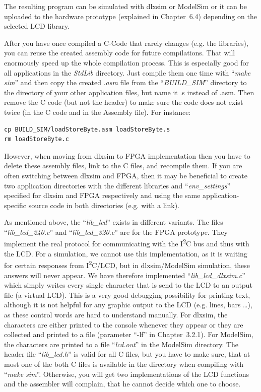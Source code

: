 The resulting program can be simulated with dlxsim or ModelSim or it can
be uploaded to the hardware prototype (explained in Chapter~6.4)
depending on the selected LCD library.

After you have once compiled a C-Code that rarely changes (e.g. the
libraries), you can reuse the created assembly code for future
compilations. That will enormously speed up the whole compilation
process. This is especially good for all applications in the
\emph{StdLib} directory. Just compile them one time with ``\emph{make
sim}'' and then copy the created .\emph{asm} file from the
``\emph{BUILD\_SIM}'' directory to the directory of your other
application files, but name it .s instead of .asm. Then remove the C
code (but not the header) to make sure the code does not exist twice (in
the C code and in the Assembly file). For instance:
\begin{lstlisting}
cp BUILD_SIM/loadStoreByte.asm loadStoreByte.s
rm loadStoreByte.c	
\end{lstlisting}
However, when moving from dlxsim to FPGA implementation then you have to
delete these assembly files, link to the C files, and recompile them. If
you are often switching between dlxsim and FPGA, then it may be
beneficial to create two application directories with the different
libraries and ``\emph{env\_settings}'' specified for dlxsim and FPGA
respectively and using the same application-specific source code in both
directories (e.g. with a link).

As mentioned above, the ``\emph{lib\_lcd}'' exists in different
variants. The files ``\emph{lib\_lcd\_240.c}'' and
``\emph{lib\_lcd\_320.c}'' are for the FPGA prototype. They implement
the real protocol for communicating with the I\textsuperscript{2}C bus
and thus with the LCD. For a simulation, we cannot use this
implementation, as it is waiting for certain responses from
I\textsuperscript{2}C/LCD, but in dlxsim/ModelSim simulation, these
answers will never appear. We have therefore implemented
``\emph{lib\_lcd\_­dlxsim.c}'' which simply writes every single
character that is send to the LCD to an output file (a virtual LCD).
This is a very good debugging possibility for printing text, although it
is not helpful for any graphic output to the LCD (e.g. lines, bars
\ldots), as these control words are hard to understand manually. For
dlxsim, the characters are either printed to the console whenever they
appear or they are collected and printed to a file (parameter ``-lf'' in
Chapter~3.2.1). For ModelSim, the characters are printed to a file
``\emph{lcd.out}'' in the ModelSim directory. The header file
``\emph{lib\_lcd.h}'' is valid for all C files, but you have to make
sure, that at most one of the both C files is available in the directory
when compiling with ``\emph{make sim}''. Otherwise, you will get two
implementations of the LCD functions and the assembler will complain,
that he cannot decide which one to choose.

